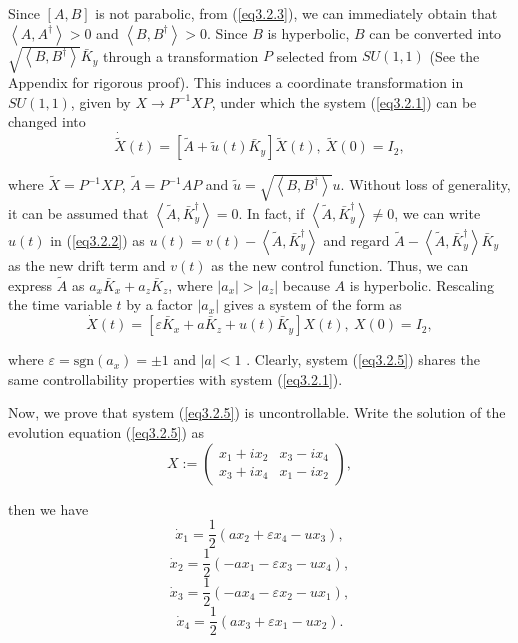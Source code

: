 \documentclass[onecolumn,showpacs,showkeys,preprintnumbers]{revtex4}
\begin{document}
\noindent Since $[A,B]$ is not parabolic, from (\ref{eq3.2.3}), we
can immediately obtain that $\left<A,A^\dag\right>>0$ and
$\left<B,B^\dag\right>>0$. Since $B$ is hyperbolic, $B$ can be
converted into $\sqrt{\left<B,B^\dag\right>}\bar{K}_y$ through a
transformation $P$ selected from $SU(1,1)$ (See the Appendix for
rigorous proof). This induces a coordinate transformation in
$SU(1,1)$, given by $X\rightarrow{P^{-1}XP}$, under which the
system (\ref{eq3.2.1}) can be changed into\noindent\begin{equation}\label{eq3.2.4}
\dot{\tilde{X}}(t)=[\tilde{A}+\tilde{u}(t)\bar{K}_y]\tilde{X}(t),~\tilde{X}(0)=I_2,
\end{equation}

\noindent where $\tilde{X}=P^{-1}XP$, $\tilde{A}=P^{-1}AP$ and
$\tilde{u}=\sqrt{\left<B,B^\dag\right>}u$. Without loss of
generality, it can be assumed that
$\left<\tilde{A},\bar{K}_y^\dag\right>=0$. In fact, if
$\left<\tilde{A},\bar{K}_y^\dag\right>\neq0$, we can write $u(t)$
in (\ref{eq3.2.2}) as
$u(t)=v(t)-\left<\tilde{A},\bar{K}_y^\dag\right>$ and regard
$\tilde{A}-\left<\tilde{A},\bar{K}_y^\dag\right>\bar{K}_y$ as the
new drift term and $v(t)$ as the new control function. Thus, we
can express $\tilde{A}$ as $a_x\bar{K}_x+a_z\bar{K}_z$, where
$|a_x|>|a_z|$ because $A$ is hyperbolic. Rescaling the time
variable $t$ by a factor $|a_x|$ gives a system of the form as\noindent\begin{equation}\label{eq3.2.5}
\dot{{X}}(t)=[\varepsilon\bar{K}_x+a\bar{K}_z+u(t)\bar{K}_y]X(t),~X(0)=I_2,
\end{equation}

\noindent where $\varepsilon=\text{sgn}(a_x)=\pm1$ and $|a|<1$ .
Clearly, system (\ref{eq3.2.5}) shares the same controllability
properties with system (\ref{eq3.2.1}).

Now, we prove that system (\ref{eq3.2.5}) is uncontrollable. Write
the solution of the evolution equation (\ref{eq3.2.5}) as\noindent\begin{equation}\label{eq3.2.6}
X:=\left(\begin{array}{cc}
  x_1+ix_2 & x_3-ix_4 \\
  x_3+ix_4 & x_1-ix_2
\end{array}\right),
\end{equation}

\noindent then we have\noindent\begin{equation}\label{eq3.2.7}
  \dot{x}_1=\frac{1}{2}(ax_2+{\varepsilon}x_4-ux_3),
\end{equation}
\noindent\begin{equation}\label{eq3.2.8}
  \dot{x}_2=\frac{1}{2}(-ax_1-{\varepsilon}x_3-ux_4),
\end{equation}
\noindent\begin{equation}\label{eq3.2.9}
  \dot{x}_3=\frac{1}{2}(-ax_4-{\varepsilon}x_2-ux_1),
\end{equation}
\noindent\begin{equation}\label{eq3.2.10}
  \dot{x}_4=\frac{1}{2}(ax_3+{\varepsilon}x_1-ux_2).
\end{equation}
\end{document}
